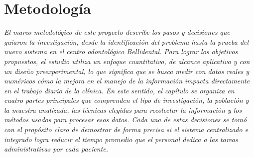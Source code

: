 \section{Metodología}
\textit{El marco metodológico de este proyecto describe los pasos y decisiones que guiaron la investigación, desde la identificación del problema hasta la prueba del nuevo sistema en el centro odontológico Bellidental. Para lograr los objetivos propuestos, el estudio utiliza un enfoque cuantitativo, de alcance aplicativo y con un diseño preexperimental, lo que significa que se busca medir con datos reales y numéricos cómo la mejora en el manejo de la información impacta directamente en el trabajo diario de la clínica. En este sentido, el capítulo se organiza en cuatro partes principales que comprenden el tipo de investigación, la población y la muestra analizada, las técnicas elegidas para recolectar la información y los métodos usados para procesar esos datos. Cada una de estas decisiones se tomó con el propósito claro de demostrar de forma precisa si el sistema centralizado e integrado logra reducir el tiempo promedio que el personal dedica a las tareas administrativas por cada paciente.}